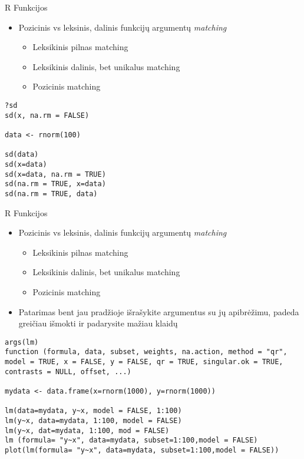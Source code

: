 \documentclass[11pt,xcolor=table]{beamer}
\begin{document}

\begin{frame}[fragile]{R Funkcijos}
\begin{itemize}
\item Pozicinis vs leksinis, dalinis funkcijų argumentų  \textit{matching}
\begin{itemize}
\item Leksikinis pilnas matching
\item Leksikinis dalinis, bet unikalus matching
\item Pozicinis matching
\end{itemize}
\end{itemize}
\begin{lstlisting}
?sd
sd(x, na.rm = FALSE)

data <- rnorm(100)

sd(data)
sd(x=data)
sd(x=data, na.rm = TRUE)
sd(na.rm = TRUE, x=data)
sd(na.rm = TRUE, data)
\end{lstlisting}
\end{frame}



\begin{frame}[fragile]{R Funkcijos}
\begin{itemize}
\item Pozicinis vs leksinis, dalinis funkcijų argumentų  \textit{matching}
\begin{itemize}
\item Leksikinis pilnas matching
\item Leksikinis dalinis, bet unikalus matching
\item Pozicinis matching
\end{itemize}
\item Patarimas bent jau pradžioje išrašykite argumentus su jų apibrėžimu, padeda greičiau išmokti ir padarysite mažiau klaidų
\end{itemize}
\begin{lstlisting}
args(lm)
function (formula, data, subset, weights, na.action, method = "qr", model = TRUE, x = FALSE, y = FALSE, qr = TRUE, singular.ok = TRUE, contrasts = NULL, offset, ...) 

mydata <- data.frame(x=rnorm(1000), y=rnorm(1000))

lm(data=mydata, y~x, model = FALSE, 1:100)
lm(y~x, data=mydata, 1:100, model = FALSE)
lm(y~x, dat=mydata, 1:100, mod = FALSE)
lm (formula= "y~x", data=mydata, subset=1:100,model = FALSE)
plot(lm(formula= "y~x", data=mydata, subset=1:100,model = FALSE))
 
\end{lstlisting}
\end{frame}
\end{document}

